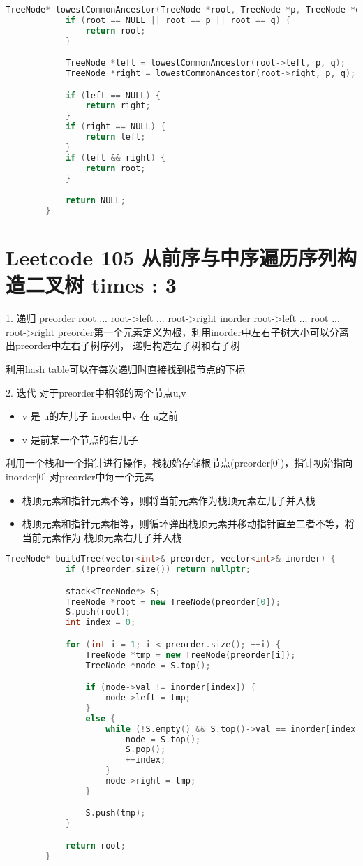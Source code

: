\documentclass[UTF8]{ctexart}
\begin{document}
\begin{framed}
	\begin{lstlisting}[language=C++]
		TreeNode* lowestCommonAncestor(TreeNode *root, TreeNode *p, TreeNode *q) {
			if (root == NULL || root == p || root == q) {
				return root;
			}

			TreeNode *left = lowestCommonAncestor(root->left, p, q);
			TreeNode *right = lowestCommonAncestor(root->right, p, q);

			if (left == NULL) {
				return right;
			}
			if (right == NULL) {
				return left;
			}
			if (left && right) {
				return root;
			}

			return NULL;
		}
	\end{lstlisting}
\end{framed}

\section{Leetcode 105 从前序与中序遍历序列构造二叉树 times : 3}
1. 递归
preorder root ... root->left ... root->right
inorder  root->left ... root ... root->right
preorder第一个元素定义为根，利用inorder中左右子树大小可以分离出preorder中左右子树序列，
递归构造左子树和右子树

利用hash table可以在每次递归时直接找到根节点的下标

2. 迭代
对于preorder中相邻的两个节点u,v
\begin{itemize}
	\item v 是 u的左儿子 inorder中v 在 u之前
	\item v 是前某一个节点的右儿子 
\end{itemize}
利用一个栈和一个指针进行操作，栈初始存储根节点(preorder[0])，指针初始指向inorder[0]
对preorder中每一个元素
\begin{itemize}
	\item 栈顶元素和指针元素不等，则将当前元素作为栈顶元素左儿子并入栈
	\item 栈顶元素和指针元素相等，则循环弹出栈顶元素并移动指针直至二者不等，将当前元素作为
			栈顶元素右儿子并入栈
\end{itemize}
\begin{framed}
	\begin{lstlisting}[language=C++]
		TreeNode* buildTree(vector<int>& preorder, vector<int>& inorder) {
			if (!preorder.size()) return nullptr;

			stack<TreeNode*> S;
			TreeNode *root = new TreeNode(preorder[0]);
			S.push(root);
			int index = 0;

			for (int i = 1; i < preorder.size(); ++i) {
				TreeNode *tmp = new TreeNode(preorder[i]);
				TreeNode *node = S.top();

				if (node->val != inorder[index]) {
					node->left = tmp;
				}
				else {
					while (!S.empty() && S.top()->val == inorder[index]) {
						node = S.top();
						S.pop();
						++index;
					}
					node->right = tmp;
				}

				S.push(tmp);
			}

			return root;
		}
	\end{lstlisting}
\end{framed}
\end{document}
